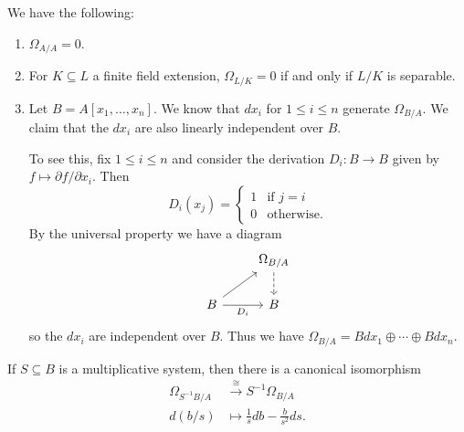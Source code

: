 \begin{example}
  We have the following:
  \begin{enumerate}
    \item[0.] $\Omega_{A / A} = 0$.
    \item For $K \subseteq L$ a finite
      field extension, $\Omega_{L / K} = 0$
      if and only if $L / K$ is separable.
    \item Let $B = A[x_1, \dots, x_n]$.
      We know that $dx_i$ for
      $1 \le i \le n$ generate
      $\Omega_{B / A}$. We claim that the
      $dx_i$ are also linearly
      independent over $B$.

      To see this, fix $1 \le i \le n$ and
      consider the
      derivation $D_i : B \to B$ given by
      $f \mapsto \partial f / \partial x_i$.
      Then
      \[
        D_i(x_j) =
        \begin{cases}
          1 & \text{if $j = i$} \\
          0 & \text{otherwise}.
        \end{cases}
      \]
      By the universal property we have a
      diagram
      \[
        \begin{tikzcd}
          & \Omega_{B / A} \ar[d, dashed] \\
          B \ar[ur] \ar[r, "D_i", swap] & B
        \end{tikzcd}
      \]
      so the $dx_i$ are independent over
      $B$. Thus we have
      $\Omega_{B / A} = B dx_1 \oplus \cdots \oplus B dx_n$.
  \end{enumerate}
\end{example}

\begin{prop}
  If $S \subseteq B$ is a multiplicative
  system, then there is a canonical isomorphism
  \begin{align*}
    \Omega_{S^{-1} B / A}
    &\overset{\cong}{\longrightarrow} S^{-1} \Omega_{B / A} \\
    d(b / s) &\longmapsto \frac{1}{s} db - \frac{b}{s^2} ds.
  \end{align*}
\end{prop}

